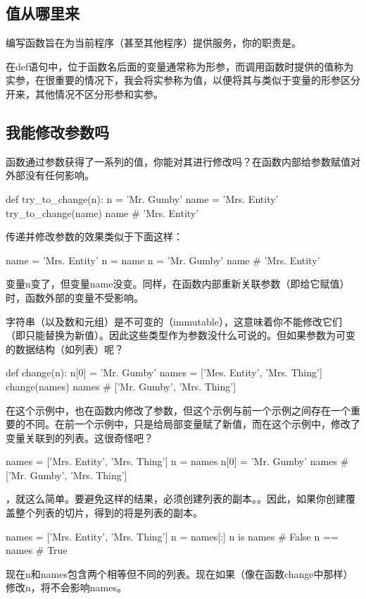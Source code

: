 \subsection{值从哪里来}
编写函数旨在为当前程序（甚至其他程序）提供服务，你的职责是。
\begin{tcolorbox}
    在def语句中，位于函数名后面的变量通常称为形参，而调用函数时提供的值称为实参，在很重要的情况下，我会将实参称为值，以便将其与类似于变量的形参区分开来，其他情况不区分形参和实参。
\end{tcolorbox}
\subsection{我能修改参数吗}
函数通过参数获得了一系列的值，你能对其进行修改吗？在函数内部给参数赋值对外部没有任何影响。
\begin{pyc}
def try_to_change(n):
    n = 'Mr. Gumby'
name = 'Mrs. Entity'
try_to_change(name)
name  # 'Mrs. Entity'
\end{pyc}

传递并修改参数的效果类似于下面这样：
\begin{tcolorbox}[title=传递并修改参数的效果示意]
    \begin{pyc}
name = 'Mrs. Entity'
n = name
n = 'Mr. Gumby'
name  # 'Mrs. Entity'
    \end{pyc}
\end{tcolorbox}
变量n变了，但变量name没变。同样，在函数内部重新关联参数（即给它赋值）时，函数外部的变量不受影响。

字符串（以及数和元组）是不可变的（immutable），这意味着你不能修改它们（即只能替换为新值）。因此这些类型作为参数没什么可说的。但如果参数为可变的数据结构（如列表）呢？

\begin{pyc}
def change(n):
    n[0] = 'Mr. Gumby'
names = ['Mes. Entity', 'Mrs. Thing']
change(names)
names  # ['Mr. Gumby', 'Mrs. Thing']
\end{pyc}
在这个示例中，也在函数内修改了参数，但这个示例与前一个示例之间存在一个重要的不同。在前一个示例中，只是给局部变量赋了新值，而在这个示例中，修改了变量关联到的列表。这很奇怪吧？

\begin{tcolorbox}[title=等效示意]
    \begin{pyc}
names = ['Mrs. Entity', 'Mrs. Thing']
n = names
n[0] = 'Mr. Gumby'
names  # ['Mr. Gumby', 'Mrs. Thing']
    \end{pyc}
\end{tcolorbox}
，就这么简单。要避免这样的结果，必须创建列表的副本。。因此，如果你创建覆盖整个列表的切片，得到的将是列表的副本。
\begin{pyc}
names = ['Mrs. Entity', 'Mrs. Thing']
n = names[:]
n is names  # False
n == names  # True
\end{pyc}
现在n和names包含两个相等但不同的列表。现在如果（像在函数change中那样）修改n，将不会影响names。


